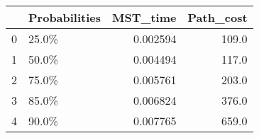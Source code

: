 \begin{tabular}{llrr}
\toprule
{} & Probabilities &  MST\_time &  Path\_cost \\
\midrule
0 &         25.0\% &  0.002594 &      109.0 \\
1 &         50.0\% &  0.004494 &      117.0 \\
2 &         75.0\% &  0.005761 &      203.0 \\
3 &         85.0\% &  0.006824 &      376.0 \\
4 &         90.0\% &  0.007765 &      659.0 \\
\bottomrule
\end{tabular}
